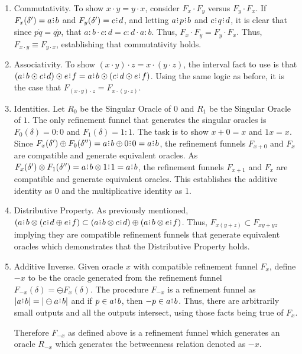 \documentclass[12pt]{article}
\begin{document}
\begin{enumerate}
    \item Commutativity. To show $x\cdot y = y \cdot x$, consider $F_x \cdot F_y$ versus $F_y \cdot F_x$. If $F_x(\delta') = a \rint b$ and $F_y(\delta') = c \rint d$, and letting $a \rint p \rint b$ and $c \rint q \rint d$, it is clear that since $p \dot q = q \dot p$, that $a:b \cdot c:d = c:d \cdot a:b$. Thus, $F_x \cdot F_y = F_y \cdot F_x$. Thus, $F_{x \cdot y} \equiv F_{y \cdot x}$, establishing that commutativity holds. 
    \item Associativity. To show $(x\cdot y) \cdot z = x \cdot (y \cdot z)$, the interval fact to use is that $(a\rint b \odot c\rint d) \odot e\rint f = a\rint b \odot (c\rint d \odot e\rint f)$. Using the same logic as before, it is the case that $F_{(x \cdot y) \cdot z} = F_{x \cdot (y \cdot z)}$. 
    \item Identities. Let $R_0$ be the Singular Oracle of $0$ and $R_1$ be the Singular Oracle of $1$. The only refinement funnel that generates the singular oracles is $F_0(\delta) = 0:0$ and $F_1(\delta) = 1:1$. The task is to show $x+0=x$ and $1x  = x$.  Since $F_x(\delta') \oplus F_0(\delta'') = a\rint b \oplus 0\rint 0 = a\rint b$, the refinement funnels $F_{x+0}$ and $F_x$ are compatible and generate equivalent oracles. As $F_x(\delta') \otimes F_1 (\delta'') = a\rint b \otimes 1\rint 1 = a\rint b$, the refinement funnels $F_{x + 1}$ and $F_x$ are compatible and generate equivalent oracles.  This establishes the additive identity as 0 and the multiplicative identity as 1. 
    \item Distributive Property. As previously mentioned, $( a\rint b \otimes ( c\rint d \oplus e\rint f) \subset (a\rint b \otimes c\rint d) \oplus (a\rint b \otimes e\rint f)$. Thus, $F_{x(y+z)} \subset F_{xy + yz}$ implying they are compatible refinement funnels that generate equivalent oracles which demonstrates that the Distributive Property holds. 
    \item Additive Inverse. Given oracle $x$ with compatible refinement funnel $F_x$, define $-x$ to be the oracle generated from the refinement funnel $F_{-x} (\delta ) = \ominus F_x(\delta)$. The procedure $F_{-x}$ is a refinement funnel as $|a \rint b| = |\ominus a \rint b|$ and if $p \in a \rint b$, then $-p \in a \rint b$. Thus, there are arbitrarily small outputs and all the outputs intersect, using those facts being true of $F_x$.

    Therefore $F_{-x}$ as defined above is a refinement funnel which generates an oracle $R_{-x}$ which generates the betweenness relation denoted as $-x$. 
    

\end{enumerate}
\end{document}
